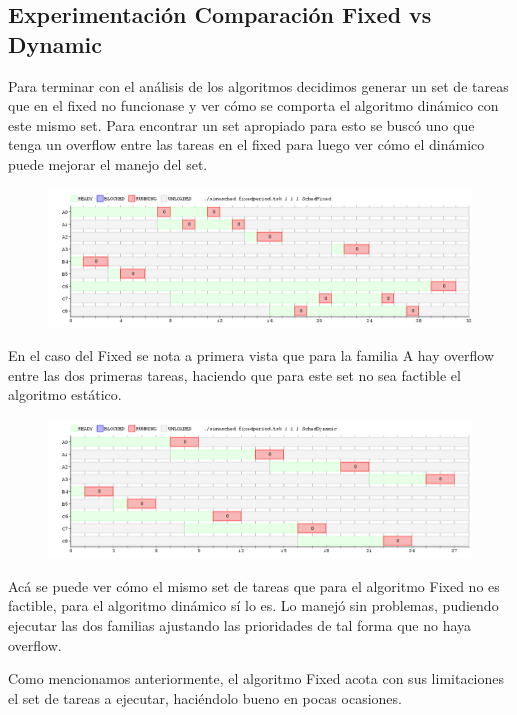 \subsection{Experimentación Comparación Fixed vs Dynamic}

Para terminar con el análisis de los algoritmos decidimos generar un set de tareas que en el fixed no funcionase y ver cómo se comporta el algoritmo dinámico con este mismo set.
Para encontrar un set apropiado para esto se buscó uno que tenga un overflow entre las tareas en el fixed para luego ver cómo el dinámico puede mejorar el manejo del set.

\begin{figure}[H]
  \centering
\includegraphics[scale=0.45]{fixedvsdynamic/fD.png}
  \caption[Algoritmo Fixed]{}
\end{figure}

En el caso del Fixed se nota a primera vista que para la familia A hay overflow entre las dos primeras tareas, haciendo que para este set no sea factible el algoritmo estático.

\begin{figure}[H]
  \centering
\includegraphics[scale=0.45]{fixedvsdynamic/fD2.png}
  \caption[Algoritmo Dinamico]{}
\end{figure}

Acá se puede ver cómo el mismo set de tareas que para el algoritmo Fixed no es factible, para el algoritmo dinámico sí lo es. Lo manejó sin problemas, pudiendo ejecutar las dos familias ajustando las prioridades de tal forma que no haya overflow.

Como mencionamos anteriormente, el algoritmo Fixed acota con sus limitaciones el set de tareas a ejecutar, haciéndolo bueno en pocas ocasiones.

